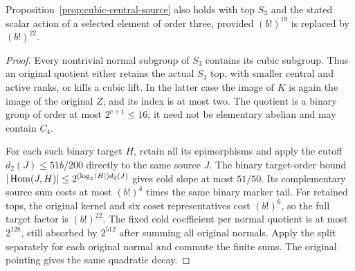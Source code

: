 \begin{corollary}\label{cor:symmetric-central-source}
Proposition~\ref{prop:cubic-central-source} also holds with top $S_3$
and the stated scalar action of a selected element of order three,
provided $(b!)^{19}$ is replaced by $(b!)^{22}$.
\end{corollary}
\begin{proof}
Every nontrivial normal subgroup of $S_3$ contains its cubic subgroup.
Thus an original quotient either retains the actual $S_3$ top, with
smaller central and active ranks, or kills a cubic lift. In the latter
case the image of $K$ is again the image of the original $Z$, and its
index is at most two. The quotient is a binary group of order at most
$2^{c+1}\leq16$; it need not be elementary abelian and may contain $C_4$.

For each such binary target $H$, retain all its epimorphisms and apply
the cutoff $d_2(J)\leq51b/200$ directly to the same source $J$.
The binary target-order bound
$|\operatorname{Hom}(J,H)|\leq2^{(\log_2|H|)d_2(J)}$ gives cold slope at most
$51/50$. Its complementary source sum costs at most $(b!)^4$ times
the same binary marker tail. For retained tops, the original kernel
and six coset representatives cost $(b!)^6$, so the full target
factor is $(b!)^{22}$. The fixed cold coefficient per normal quotient
is at most $2^{128}$, still absorbed by $2^{512}$ after summing all
original normals. Apply the split separately for each original
normal and commute the finite sums. The original pointing gives the
same quadratic decay.
\end{proof}

